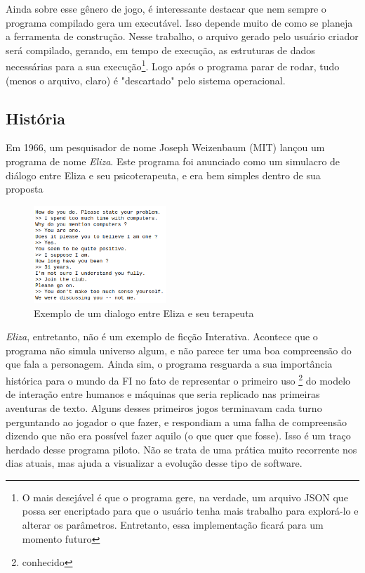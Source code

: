 Ainda sobre esse gênero de jogo, é interessante destacar que nem sempre o
programa compilado gera um executável. Isso depende muito de como se planeja a
ferramenta de construção. Nesse trabalho, o arquivo gerado pelo usuário criador
será compilado, gerando, em tempo de execução, as estruturas de dados
necessárias para a sua execução\footnote{O mais desejável é que o programa gere,
na verdade, um arquivo JSON que possa ser encriptado para que o usuário tenha
mais trabalho para explorá-lo e alterar os parâmetros. Entretanto, essa
implementação ficará para um momento futuro}. Logo após o programa parar de
rodar, tudo (menos o arquivo, claro) é "descartado" pelo sistema operacional.

\subsection{História}
\label{subsec:history}

Em 1966, um pesquisador de nome Joseph Weizenbaum (MIT) lançou um programa de
nome \emph{Eliza}. Este programa foi anunciado como um simulacro de diálogo
entre Eliza e seu psicoterapeuta, e era bem simples dentro de sua proposta

\begin{figure}[htb]
\includegraphics[width=5cm]{figuras/eliza}
\caption{\label{fig:eliza}Exemplo de um dialogo entre Eliza e seu terapeuta}
\end{figure}

\emph{Eliza}, entretanto, não é um exemplo de ficção Interativa. Acontece que o
programa não simula universo algum, e não parece ter uma boa compreensão do que
fala a personagem. Ainda sim, o programa resguarda a sua importância histórica
para o mundo da FI no fato de representar o primeiro uso \footnote{conhecido} do
modelo de interação entre humanos e máquinas que seria replicado nas primeiras
aventuras de texto. Alguns desses primeiros jogos terminavam cada turno
perguntando ao jogador o que fazer, e respondiam a uma falha de compreensão
dizendo que não era possível fazer aquilo (o que quer que fosse). Isso é um
traço herdado desse programa piloto. Não se trata de uma prática muito
recorrente nos dias atuais, mas ajuda a visualizar a evolução desse tipo de
software.


